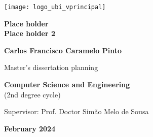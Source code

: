 \begin{titlepage}
\begin{center}

\begin{flushright}
 \texttt{[image: logo\_ubi\_vprincipal]}\\


\vspace{7.6cm}

\rostotitulo \textbf{Place holder} \\
\rostosubtit \textbf{Place holder 2}\\

\vspace{1.8cm}

\rostonomes \textbf{Carlos Francisco Caramelo Pinto}\\

\vspace{1.4cm}


\rostooutros Master's dissertation planning

\rostonomes \textbf{Computer Science and Engineering}\\
\rostooutros (2nd degree cycle)\\

\vspace{3.3cm}

\rostooutros Supervisor: Prof. Doctor Simão Melo de Sousa\\

\vspace{1.4cm}

\rostooutros \textbf{February 2024}

\end{flushright}

\end{center}
\end{titlepage}
